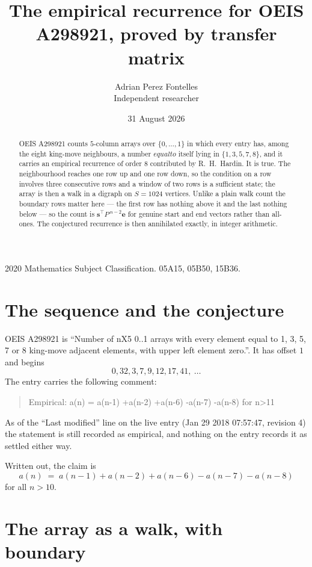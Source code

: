 \documentclass[11pt,a4paper]{article}
\title{The empirical recurrence for OEIS A298921, proved by transfer matrix}
\author{Adrian Perez Fontelles\\ \small Independent researcher}
\date{31 August 2026}
\theoremstyle{plain}
\theoremstyle{definition}
\begin{document}
\maketitle

\begin{abstract}
OEIS A298921 counts $5$-column arrays over $\{0,\dots,1\}$ in which every entry has,
among the eight king-move neighbours, a number $equal to$ itself lying in $\{1,3,5,7,8\}$, and it carries an empirical
recurrence of order $8$ contributed by R.~H.~Hardin. It is true. The neighbourhood
reaches one row up and one row down, so the condition on a row involves three consecutive
rows and a window of two rows is a sufficient state; the array is then a walk in a digraph
on $S=1024$ vertices. Unlike a plain walk count the boundary rows matter here --- the first
row has nothing above it and the last nothing below --- so the count is
$\mathbf{s}^{\!\top}P^{\,n-2}\mathbf{e}$ for genuine start and end vectors rather than
all-ones. The conjectured recurrence is then annihilated exactly, in integer arithmetic.
\end{abstract}

\noindent\small 2020 Mathematics Subject Classification. 05A15, 05B50, 15B36.\normalsize

\section{The sequence and the conjecture}

OEIS A298921 is ``Number of nX5 0..1 arrays with every element equal to 1, 3, 5, 7 or 8 king-move adjacent elements, with upper left element zero.''. It has offset
$1$ and begins
\[
0, 32, 3, 7, 9, 12, 17, 41,\ \dots
\]
The entry carries the following comment:
\begin{quote}\small
Empirical: a(n) = a(n-1) +a(n-2) +a(n-6) -a(n-7) -a(n-8) for n>11
\end{quote}
As of the ``Last modified'' line on the live entry (Jan 29 2018 07:57:47, revision
4) the statement is still recorded as empirical, and nothing on the entry
records it as settled either way.

Written out, the claim is
\begin{equation}\label{eq:conj}
a(n)\;=\;a(n-1) + a(n-2) + a(n-6) - a(n-7) - a(n-8)
\end{equation}
for all $n>10$.

\section{The array as a walk, with boundary}
\end{document}
